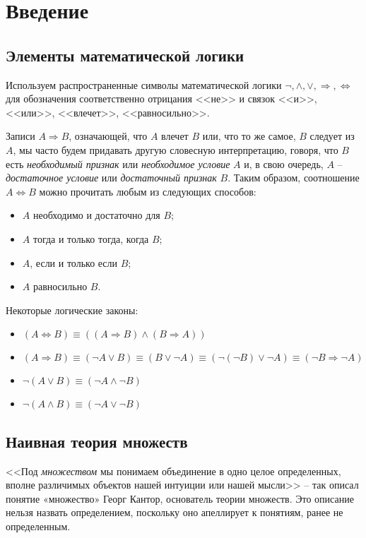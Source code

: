 \section{Введение}
\subsection{Элементы математической логики}
Используем распространенные символы математической логики $\neg, \wedge, \vee, \Rightarrow, \Leftrightarrow$ для обозначения соответственно отрицания <<не>> и связок <<и>>, <<или>>, <<влечет>>, <<равносильно>>.


Записи $A \Rightarrow B$, означающей, что $A$ влечет $B$ или, что то же самое, $B$ следует из $A$, мы часто будем придавать другую словесную интерпретацию, говоря, что $B$ есть \textit{необходимый признак} или \textit{необходимое условие} $A$ и, в свою очередь, $A$ -- \textit{достаточное условие} или \textit{достаточный признак} $B$.
Таким образом, соотношение $A \Leftrightarrow B$ можно прочитать любым из следующих способов:
\begin{itemize}
    \item[] $A$ необходимо и достаточно для $B$;
    \item[] $A$ тогда и только тогда, когда $B$;
    \item[] $A$, если и только если $B$;
    \item[] $A$ равносильно $B$.
\end{itemize}

Некоторые логические законы:
\begin{itemize}
    \item[] $(A \Leftrightarrow B) \equiv ((A \Rightarrow B) \wedge (B \Rightarrow A))$
    \item[] $(A \Rightarrow B) \equiv (\neg A \vee B) \equiv (B \vee \neg A) \equiv (\neg (\neg B) \vee \neg A) \equiv (\neg B \Rightarrow \neg A)$
    \item[] $\neg (A \vee B) \equiv (\neg A \wedge \neg B)$
    \item[] $\neg (A \wedge B) \equiv (\neg A \vee \neg B)$
\end{itemize}

\subsection{Наивная теория множеств}
<<Под \textit{множеством} мы понимаем объединение в одно целое определенных, вполне различимых объектов нашей интуиции или нашей мысли>> -- так описал понятие «множество» Георг Кантор, основатель теории множеств. Это описание нельзя назвать определением, поскольку оно апеллирует к понятиям, ранее не определенным.


